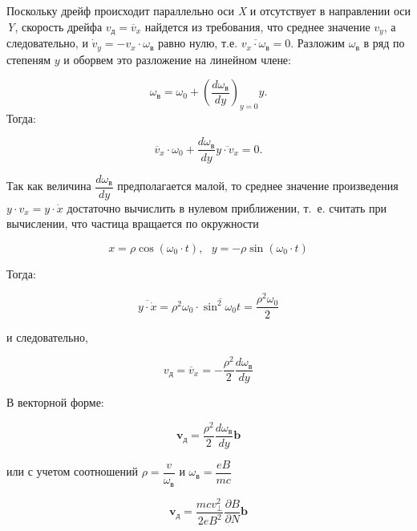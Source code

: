 Поскольку дрейф происходит параллельно оси \textit{X} и отсутствует в направлении оси \textit{Y}, скорость дрейфа $v_д = \overline{v}_x$ найдется из требования, что среднее значение $v_y$, а следовательно, и $\dot v_y = -v_x \cdot \omega_в$ равно нулю, т.е. $\overline{v_x \cdot \omega_в} = 0$. Разложим $\omega_в$ в ряд по степеням $y$ и оборвем это разложение на линейном члене:

\begin{equation*}
    \omega_в = \omega_0 + \left( \dfrac{d\omega_в}{dy} \right)_{y=0} y.
\end{equation*}
Тогда:

\begin{equation*}
    \overline{v}_x \cdot \omega_0 + \dfrac{d\omega_в}{dy} \overline{y \cdot v_x} = 0.
\end{equation*}

Так как величина $\dfrac{d\omega_в}{dy}$ предполагается малой, то среднее значение произведения $y \cdot v_x = y \cdot \dot x$ достаточно вычислить в нулевом приближении, т.~е. считать при вычислении, что частица вращается по окружности

\begin{equation*}
    x = \rho \cos \left( \omega_0 \cdot t \right), ~~~y = - \rho \sin \left( \omega_0 \cdot t \right)
\end{equation*}

Тогда:

\begin{equation*}
    \overline{y \cdot \dot x} = \rho^2 \omega_0 \cdot \overline{\sin^2 \omega_0 t} = \dfrac{\rho^2 \omega_0}{2}
\end{equation*}

и следовательно,

\begin{equation*}
    v_д = \overline{v}_x = -\dfrac{\rho^2}{2} \dfrac{d\omega_в}{dy}
\end{equation*}

В векторной форме:

\begin{equation}
    \label{formula_41}
    \textbf{v}_д = \dfrac{\rho^2}{2} \dfrac{d\omega_в}{dy} \textbf{b}
\end{equation}

или с учетом соотношений $\rho = \dfrac{v}{\omega_в}$ и $\omega_в = \dfrac{eB}{mc}$

\begin{equation}
    \label{formula_42}
    \textbf{v}_д = \dfrac{mcv^2_{\perp}}{2eB^2} \dfrac{\partial B}{\partial N} \textbf{b}
\end{equation}

